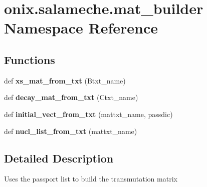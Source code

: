 \hypertarget{namespaceonix_1_1salameche_1_1mat__builder}{}\section{onix.\+salameche.\+mat\+\_\+builder Namespace Reference}
\label{namespaceonix_1_1salameche_1_1mat__builder}
\subsection*{Functions}
\begin{DoxyCompactItemize}
\item 
\mbox{\label{namespaceonix_1_1salameche_1_1mat__builder_a84df88436e0f54a9cb36b6d316a4ec75}} 
def {\bfseries xs\+\_\+mat\+\_\+from\+\_\+txt} (Btxt\+\_\+name)
\item 
\mbox{\label{namespaceonix_1_1salameche_1_1mat__builder_adaf15257170c1305f25348433d920824}} 
def {\bfseries decay\+\_\+mat\+\_\+from\+\_\+txt} (Ctxt\+\_\+name)
\item 
\mbox{\label{namespaceonix_1_1salameche_1_1mat__builder_a916b4989683310a45ed57bdda7aef378}} 
def {\bfseries initial\+\_\+vect\+\_\+from\+\_\+txt} (mattxt\+\_\+name, passdic)
\item 
\mbox{\label{namespaceonix_1_1salameche_1_1mat__builder_a20454997de9cb28ad75fcf282e5ead08}} 
def {\bfseries nucl\+\_\+list\+\_\+from\+\_\+txt} (mattxt\+\_\+name)
\end{DoxyCompactItemize}


\subsection{Detailed Description}
\begin{DoxyVerb}Uses the passport list to build the transmutation matrix\end{DoxyVerb}
 